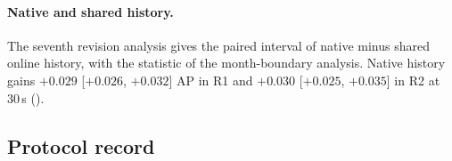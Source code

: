 
\paragraph{Native and shared history.}
The seventh revision analysis gives the paired interval of native minus shared online history, with the statistic of the month-boundary analysis.
Native history gains $+0.029$ [$+0.026$, $+0.032$] AP in R1 and $+0.030$ [$+0.025$, $+0.035$] in R2 at 30\,s ().

\subsection{Protocol record}
